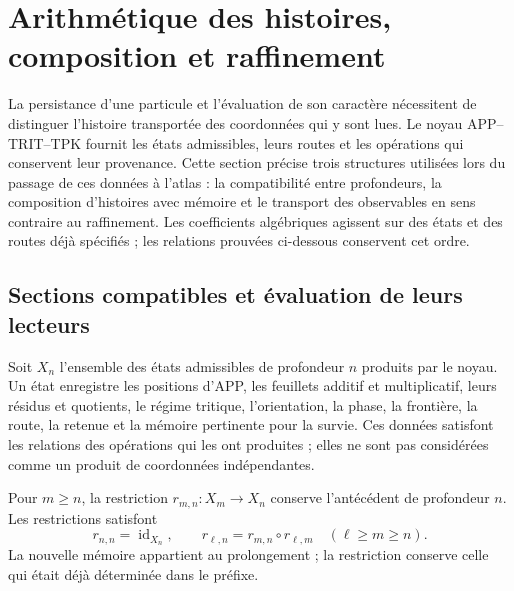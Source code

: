 \section{Arithmétique des histoires, composition et raffinement}
\label{vi:hist:seccion-principal}

La persistance d’une particule et l’évaluation de son caractère nécessitent
de distinguer l’histoire transportée des coordonnées qui y sont lues.
Le noyau APP--TRIT--TPK fournit les états admissibles, leurs routes et
les opérations qui conservent leur provenance. Cette section précise trois
structures utilisées lors du passage de ces données à l’atlas : la compatibilité
entre profondeurs, la composition d’histoires avec mémoire et le
transport des observables en sens contraire au raffinement.
Les coefficients algébriques agissent sur des états et des routes déjà spécifiés ;
les relations prouvées ci-dessous conservent cet ordre.

\subsection{Sections compatibles et évaluation de leurs lecteurs}
\label{hist:seccion}

Soit \(X_n\) l’ensemble des états admissibles de profondeur \(n\)
produits par le noyau. Un état enregistre les positions d’APP, les
feuillets additif et multiplicatif, leurs résidus et quotients, le régime
tritique, l’orientation, la phase, la frontière, la route, la retenue et la
mémoire pertinente pour la survie. Ces données satisfont les
relations des opérations qui les ont produites ; elles ne sont pas considérées comme un
produit de coordonnées indépendantes.

Pour \(m\ge n\), la restriction
\(r_{m,n}:X_m\longrightarrow X_n\) conserve l’antécédent de profondeur
\(n\). Les restrictions satisfont
\begin{equation}
 r_{n,n}=\operatorname{id}_{X_n},\qquad
 r_{\ell,n}=r_{m,n}\circ r_{\ell,m}
 \quad(\ell\ge m\ge n).
 \label{vi:hist:restricciones}
\end{equation}
La nouvelle mémoire appartient au prolongement ; la restriction conserve celle
qui était déjà déterminée dans le préfixe.

